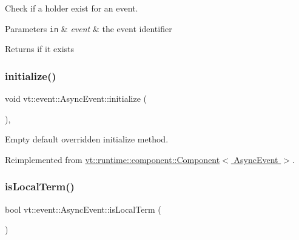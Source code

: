 Check if a holder exist for an event. 


\begin{DoxyParams}[1]{Parameters}
\mbox{\tt in}  & {\em event} & the event identifier\\
\hline
\end{DoxyParams}
\begin{DoxyReturn}{Returns}
if it exists 
\end{DoxyReturn}
\mbox{\label{structvt_1_1event_1_1_async_event_ac8d9f977b1cca3f43a06d0e83bc88e3d}} 
\subsubsection{\texorpdfstring{initialize()}{initialize()}}
{\footnotesize\ttfamily void vt\+::event\+::\+Async\+Event\+::initialize (\begin{DoxyParamCaption}{ }\end{DoxyParamCaption})\hspace{0.3cm}{\ttfamily [override]}, {\ttfamily [virtual]}}



Empty default overridden initialize method. 



Reimplemented from \hyperlink{structvt_1_1runtime_1_1component_1_1_component_a7f07384d294e59796add9ce6be2d6410}{vt\+::runtime\+::component\+::\+Component$<$ Async\+Event $>$}.

\mbox{\label{structvt_1_1event_1_1_async_event_a10af2d5cb5318e2ef25eabcd88c8139a}} 
\subsubsection{\texorpdfstring{is\+Local\+Term()}{isLocalTerm()}}
{\footnotesize\ttfamily bool vt\+::event\+::\+Async\+Event\+::is\+Local\+Term (\begin{DoxyParamCaption}{ }\end{DoxyParamCaption})}

